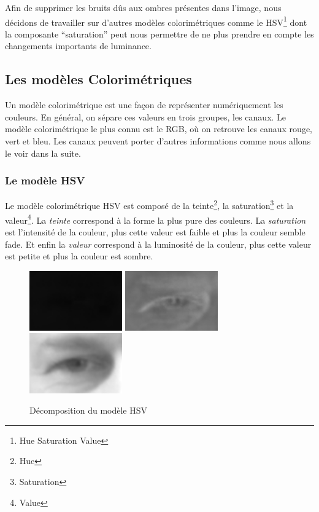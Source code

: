 Afin de supprimer les bruits dûs aux ombres présentes dans l'image, nous décidons de travailler sur d'autres modèles
colorimétriques comme le HSV\footnote{Hue Saturation Value} dont la composante \enquote{saturation} peut nous
permettre de ne plus prendre en compte les changements importants de luminance.

\subsection{Les modèles Colorimétriques}
Un modèle colorimétrique est une façon de représenter numériquement les couleurs. En général, on sépare ces valeurs en trois groupes, les canaux.
Le modèle colorimétrique le plus connu est le RGB, où on retrouve les canaux rouge, vert et bleu. Les canaux peuvent porter
d'autres informations comme nous allons le voir dans la suite.

\subsubsection{Le modèle HSV}
Le modèle colorimétrique HSV est composé de la teinte\footnote{Hue}, la saturation\footnote{Saturation} et la valeur\footnote{Value}.
La \textit{teinte} correspond à la forme la plus pure des couleurs. La \textit{saturation} est l'intensité de la couleur, plus cette valeur est faible
et plus la couleur semble fade. Et enfin la \textit{valeur} correspond à la luminosité de la couleur, plus cette valeur est petite et plus la
couleur est sombre.

\begin{figure}[H]
 \center
 \includegraphics[width=4cm]{image/hue.png}
 \includegraphics[width=4cm]{image/saturation.png}
 \includegraphics[width=4cm]{image/value.png}
 \caption{Décomposition du modèle HSV}
\end{figure}

